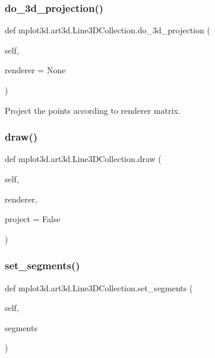 \subsubsection{\texorpdfstring{do\+\_\+3d\+\_\+projection()}{do\_3d\_projection()}}
{\footnotesize\ttfamily def mplot3d.\+art3d.\+Line3\+D\+Collection.\+do\+\_\+3d\+\_\+projection (\begin{DoxyParamCaption}\item[{}]{self,  }\item[{}]{renderer = {\ttfamily None} }\end{DoxyParamCaption})}

\begin{DoxyVerb}Project the points according to renderer matrix.
\end{DoxyVerb}
 \mbox{\label{classmplot3d_1_1art3d_1_1Line3DCollection_a21691d738ca52b08e53338ad4e3775b9}} 
\subsubsection{\texorpdfstring{draw()}{draw()}}
{\footnotesize\ttfamily def mplot3d.\+art3d.\+Line3\+D\+Collection.\+draw (\begin{DoxyParamCaption}\item[{}]{self,  }\item[{}]{renderer,  }\item[{}]{project = {\ttfamily False} }\end{DoxyParamCaption})}

\mbox{\label{classmplot3d_1_1art3d_1_1Line3DCollection_a6b8eae8b6c743c35a2494fcc2ad00402}} 
\subsubsection{\texorpdfstring{set\+\_\+segments()}{set\_segments()}}
{\footnotesize\ttfamily def mplot3d.\+art3d.\+Line3\+D\+Collection.\+set\+\_\+segments (\begin{DoxyParamCaption}\item[{}]{self,  }\item[{}]{segments }\end{DoxyParamCaption})}

